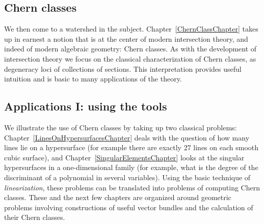 %


\subsection{Chern classes}

We then come to a watershed in the subject.  Chapter~\ref{ChernClassChapter} takes up in earnest a notion that is at the center of modern intersection theory, and indeed of modern algebraic geometry: Chern classes. As with the development of intersection theory we focus on the classical characterization of Chern classes, as degeneracy loci of collections of sections. This interpretation provides useful intuition and is basic to many applications of the theory.


\subsection{Applications I: using the tools} 

We illustrate the use of Chern classes by taking up two classical problems: Chapter~\ref{LinesOnHypersurfacesChapter} deals with the question of how many lines lie on a hypersurface (for example there are exactly 27 lines on each smooth cubic surface), and Chapter~\ref{SingularElementsChapter} looks at the singular hypersurfaces in a one-dimensional family  (for example, what is the degree of the discriminant of a polynomial in several variables). Using the basic technique of \emph{linearization}, these problems can be translated into problems of computing Chern classes. These and the next few chapters are organized around geometric problems involving  constructions of useful vector bundles and the calculation of their Chern classes. 

